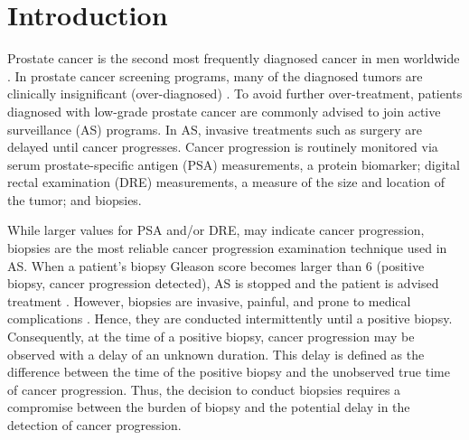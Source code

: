 
\section{Introduction}
\label{sec:introduction}
Prostate cancer is the second most frequently diagnosed cancer in men worldwide \cite{GlobalCancerStats2012}. In prostate cancer screening programs, many of the diagnosed tumors are clinically insignificant (over-diagnosed) \cite{etzioni2002overdiagnosis}. To avoid further over-treatment, patients diagnosed with low-grade prostate cancer are commonly advised to join active surveillance (AS) programs. In AS, invasive treatments such as surgery are delayed until cancer progresses. Cancer progression is routinely monitored via serum prostate-specific antigen (PSA) measurements, a protein biomarker; digital rectal examination (DRE) measurements, a measure of the size and location of the tumor; and biopsies.

While larger values for PSA and/or DRE, may indicate cancer progression, biopsies are the most reliable cancer progression examination technique used in AS. When a patient's biopsy Gleason score becomes larger than 6 (positive biopsy, cancer progression detected), AS is stopped and the patient is advised treatment \cite{bokhorst2015compliance}. However, biopsies are invasive, painful, and prone to medical complications \cite{ehdaie2014impact,fujita2009serial}. Hence, they are conducted intermittently until a positive biopsy. Consequently, at the time of a positive biopsy, cancer progression may be observed with a delay of an unknown duration. This delay is defined as the difference between the time of the positive biopsy and the unobserved true time of cancer progression. Thus, the decision to conduct biopsies requires a compromise between the burden of biopsy and the potential delay in the detection of cancer progression.

